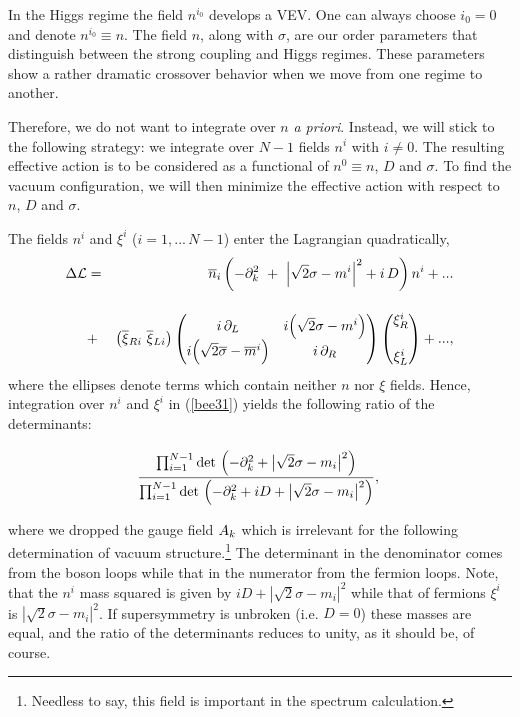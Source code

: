 \documentclass[epsfig,12pt]{article}
\def\beq{\begin{equation}}
\def\eeq{\end{equation}}
\def\beqn{\begin{eqnarray}}
\def\eeqn{\end{eqnarray}}
\newcommand{\cell}{{\mathcal L}}
\newcommand{\pt}{\partial}
\def\beqn{\begin{eqnarray}}
\def\eeqn{\end{eqnarray}}
\def\beq{\begin{equation}}
\def\eeq{\end{equation}}
\newcommand{\p}{\partial}
\newcommand{\ov}{\overline}
\newcommand{\nbar}{\ov{n}}
\newcommand{\bxi}{\ov{\xi}{}}
\begin{document}
In the Higgs regime the field $n^{i_0}$ develops a VEV.
One can always choose $i_0=0$ and denote $n^{i_0}\equiv n$. 
The field $n$, along with $\sigma$, are
our order parameters that distinguish between the
strong coupling  and Higgs regimes. These parameters show a rather dramatic crossover behavior
when we move from one regime to another.

Therefore, we do not want
to integrate over $n$ {\em a priori}. Instead,
we will stick to the following strategy:  we integrate over $N-1$
fields $n^{i}$ with $i \ne 0$.
The resulting effective action is to be considered as
a functional of $n^0\equiv n$, $D$ and
$\sigma$. To find the vacuum configuration, we will then minimize the
effective action with
respect to $n$, $D$ and
$\sigma$.

The fields $ n^i $ and $ \xi^i $  ($ i = 1,...\, N-1 $) enter the Lagrangian quadratically,
\beqn
\Delta\cell &=&
 \nbar{}_i 
		   \left( - \p_k^2 ~+~ \Bigl| \sqrt{2}\sigma - m^i \Bigr|^2 +  i\, D \right) n^i
		   + ...
\nonumber\\[4mm]
&+&
\left( \bxi_{Ri}\,\,  \bxi_{Li} \right)
		\left( \begin{matrix}
			i\,\pt_L  &  
			i \Bigl(\sqrt{2}\sigma -  m^i\Bigr) \\
			i \Bigl(\sqrt{2}\ov{\sigma} - \ov{m}{}^i \Bigr) &  
			i\,\p_R 
		     \end{matrix} \right)
		\left( \begin{matrix}
			\xi_R^i \\[5mm] \xi_L^i
		     \end{matrix} \right)+ ... ,
\eeqn
where the ellipses denote terms which contain neither $n$ nor $\xi$ fields.
Hence, integration over $n^{i}$ and $\xi^i$ in (\ref{bee31})
yields the following ratio of the determinants:
\beq
 \frac{
\prod_{i=1}^{N-1} {\rm det}\, \left(-\pt_{k}^2 
   + \bigl| \sqrt{2}\sigma - m_i \bigr|^2\right)}{
\prod_{i=1}^{N-1}{\rm det}\, \left(-\pt_{k}^2 +iD
   + \bigl| \sqrt{2}\sigma - m_i \bigr|^2\right)},
\rule{0mm}{10mm}
\label{det}
\eeq
where we dropped the gauge field $A_k\rule{0mm}{5mm}$ which is
irrelevant for the following determination of  vacuum structure.\footnote{Needless to say, this field is important in the spectrum calculation.} The  determinant in the denominator
comes from the
boson loops while that in the numerator from the fermion loops. Note, that the $n^{i}$ mass 
squared
 is given by $iD+|\sqrt{2}\sigma-m_i|^2$ while that of fermions $\xi^i$
is $|\sqrt{2}\sigma-m_i|^2$. If supersymmetry is unbroken (i.e.  $D=0$) these masses are equal,
and the ratio of the determinants reduces to unity, as
it should be, of course.
\end{document}

